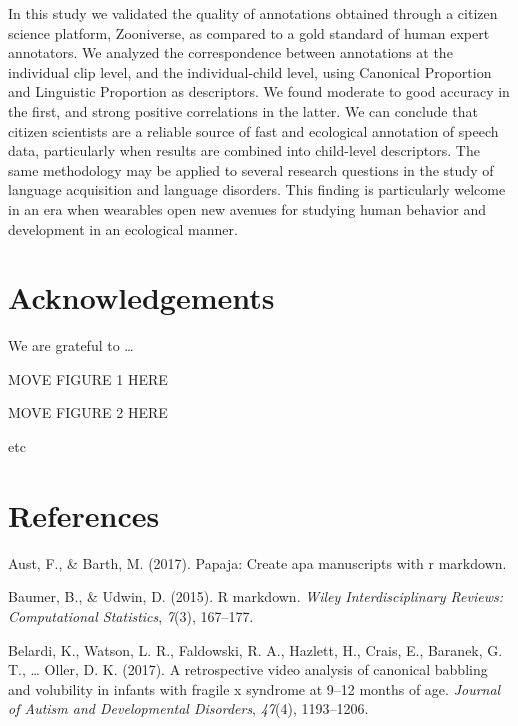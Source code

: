\documentclass[english,,man]{apa6}
\begin{document}
In this study we validated the quality of annotations obtained through a citizen science platform, Zooniverse, as compared to a gold standard of human expert annotators. We analyzed the correspondence between annotations at the individual clip level, and the individual-child level, using Canonical Proportion and Linguistic Proportion as descriptors. We found moderate to good accuracy in the first, and strong positive correlations in the latter. We can conclude that citizen scientists are a reliable source of fast and ecological annotation of speech data, particularly when results are combined into child-level descriptors. The same methodology may be applied to several research questions in the study of language acquisition and language disorders. This finding is particularly welcome in an era when wearables open new avenues for studying human behavior and development in an ecological manner.

\newpage

\hypertarget{acknowledgements}{%
\section{Acknowledgements}\label{acknowledgements}}

We are grateful to \ldots{}

\newpage

MOVE FIGURE 1 HERE

\newpage

MOVE FIGURE 2 HERE

etc

\hypertarget{references}{%
\section{References}\label{references}}

\setlength{\parindent}{-0.5in}
\setlength{\leftskip}{0.5in}

\hypertarget{refs}{}
\leavevmode\hypertarget{ref-aust2017papaja}{}%
Aust, F., \& Barth, M. (2017). Papaja: Create apa manuscripts with r markdown.

\leavevmode\hypertarget{ref-baumer2015r}{}%
Baumer, B., \& Udwin, D. (2015). R markdown. \emph{Wiley Interdisciplinary Reviews: Computational Statistics}, \emph{7}(3), 167--177.

\leavevmode\hypertarget{ref-belardi2017retrospective}{}%
Belardi, K., Watson, L. R., Faldowski, R. A., Hazlett, H., Crais, E., Baranek, G. T., \ldots{} Oller, D. K. (2017). A retrospective video analysis of canonical babbling and volubility in infants with fragile x syndrome at 9--12 months of age. \emph{Journal of Autism and Developmental Disorders}, \emph{47}(4), 1193--1206.
\end{document}
